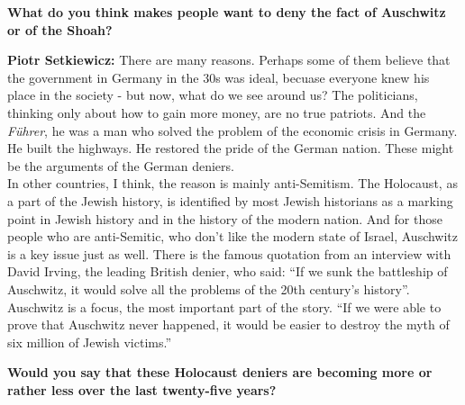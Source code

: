 \textbf{What do you think makes people want to deny the fact of Auschwitz or of the Shoah?}

\textbf{Piotr Setkiewicz:} There are many reasons. Perhaps some of them believe that the government in Germany in the 30s was ideal, becuase everyone knew his place in the society - but now, what do we see around us? The politicians, thinking only about how to gain more money, are no true patriots. And the \textit{Führer}, he was a man who solved the problem of the economic crisis in Germany. He built the highways. He restored the pride of the German nation. These might be the arguments of the German deniers.\\
In other countries, I think, the reason is mainly anti-Semitism. The Holocaust, as a part of the Jewish history, is identified by most Jewish historians as a marking point in Jewish history and in the history of the modern nation. And for those people who are anti-Semitic, who don’t like the modern state of Israel, Auschwitz is a key issue just as well. There is the famous quotation from an interview with David Irving, the leading British denier, who said: ``If we sunk the battleship of Auschwitz, it would solve all the problems of the 20th century’s history''. Auschwitz is a focus, the most important part of the story. ``If we were able to prove that Auschwitz never happened, it would be easier to destroy the myth of six million of Jewish victims.''

\textbf{Would you say that these Holocaust deniers are becoming more or rather less over the last twenty-five years?}

